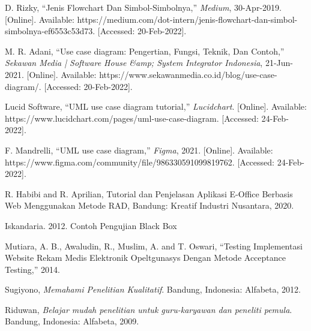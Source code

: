 \begin{thebibliography}{7}
D. Rizky, “Jenis Flowchart Dan Simbol-Simbolnya,” \emph{Medium}, 30-Apr-2019. [Online]. Available: https://medium.com/dot-intern/jenis-flowchart-dan-simbol-simbolnya-ef6553c53d73. [Accessed: 20-Feb-2022]. 

M. R. Adani, “Use case diagram: Pengertian, Fungsi, Teknik, Dan Contoh,” \emph{Sekawan Media | Software House \&amp; System Integrator Indonesia}, 21-Jun-2021. [Online]. Available: https://www.sekawanmedia.co.id/blog/use-case-diagram/. [Accessed: 20-Feb-2022]. 

Lucid Software, “UML use case diagram tutorial,” \emph{Lucidchart}. [Online]. Available: https://www.lucidchart.com/pages/uml-use-case-diagram. [Accessed: 24-Feb-2022]. 

F. Mandrelli, “UML use case diagram,” \emph{Figma}, 2021. [Online]. Available: https://www.figma.com/community/file/986330591099819762. [Accessed: 24-Feb-2022]. 

R.   Habibi   and   R.   Aprilian,   Tutorial   dan Penjelasan  Aplikasi  E-Office  Berbasis  Web Menggunakan Metode RAD, Bandung: Kreatif Industri Nusantara, 2020. 

Iskandaria. 2012. Contoh Pengujian Black Box

Mutiara, A. B., Awaludin, R., Muslim, A. and T. Oswari, “Testing Implementasi Website Rekam Medis Elektronik Opeltgunasys Dengan Metode Acceptance Testing,” 2014.

Sugiyono, \emph{Memahami Penelitian Kualitatif}. Bandung, Indonesia: Alfabeta, 2012.

Riduwan, \emph{Belajar mudah penelitian untuk guru-karyawan dan peneliti pemula}. Bandung, Indonesia: Alfabeta, 2009. 


\end{thebibliography}


